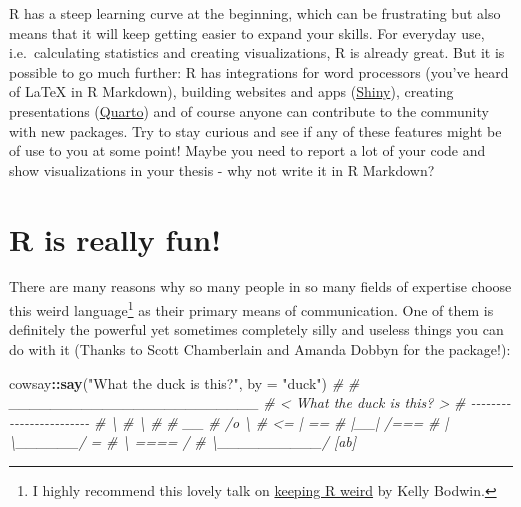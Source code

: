 \documentclass[
]{book}
\newenvironment{Shaded}{\begin{snugshade}}{\end{snugshade}}
\newcommand{\AttributeTok}[1]{\textcolor[rgb]{0.13,0.29,0.53}{#1}}
\newcommand{\CommentTok}[1]{\textcolor[rgb]{0.56,0.35,0.01}{\textit{#1}}}
\newcommand{\FunctionTok}[1]{\textcolor[rgb]{0.13,0.29,0.53}{\textbf{#1}}}
\newcommand{\NormalTok}[1]{#1}
\newcommand{\SpecialCharTok}[1]{\textcolor[rgb]{0.81,0.36,0.00}{\textbf{#1}}}
\newcommand{\StringTok}[1]{\textcolor[rgb]{0.31,0.60,0.02}{#1}}
\begin{document}
R has a steep learning curve at the beginning, which can be frustrating but also means that it will keep getting easier to expand your skills.
For everyday use, i.e.~calculating statistics and creating visualizations, R is already great.
But it is possible to go much further: R has integrations for word processors (you've heard of LaTeX in R Markdown), building websites and apps (\href{https://shiny.posit.co/r/getstarted/shiny-basics/lesson1/index.html}{Shiny}), creating presentations (\href{https://quarto.org/docs/get-started/hello/rstudio.html}{Quarto}) and of course anyone can contribute to the community with new packages.
Try to stay curious and see if any of these features might be of use to you at some point!
Maybe you need to report a lot of your code and show visualizations in your thesis - why not write it in R Markdown?

\section*{R is really fun!}\label{r-is-really-fun}

There are many reasons why so many people in so many fields of expertise choose this weird language\footnote{I highly recommend this lovely talk on \href{https://youtu.be/KOQBfC1WPwM?si=M_eStpWXBf56UGy7}{keeping R weird} by Kelly Bodwin.} as their primary means of communication.
One of them is definitely the powerful yet sometimes completely silly and useless things you can do with it (Thanks to Scott Chamberlain and Amanda Dobbyn for the package!):

\begin{Shaded}
\begin{Highlighting}[]
\NormalTok{cowsay}\SpecialCharTok{::}\FunctionTok{say}\NormalTok{(}\StringTok{"What the duck is this?"}\NormalTok{, }\AttributeTok{by =} \StringTok{"duck"}\NormalTok{)}
\CommentTok{\# }
\CommentTok{\#  \_\_\_\_\_\_\_\_\_\_\_\_\_\_\_\_\_\_\_\_\_\_\_\_ }
\CommentTok{\# \textless{} What the duck is this? \textgreater{}}
\CommentTok{\#  {-}{-}{-}{-}{-}{-}{-}{-}{-}{-}{-}{-}{-}{-}{-}{-}{-}{-}{-}{-}{-}{-}{-}{-} }
\CommentTok{\#       \textbackslash{}}
\CommentTok{\#        \textbackslash{}}
\CommentTok{\# }
\CommentTok{\#          \_\_}
\CommentTok{\#         /o \textbackslash{}}
\CommentTok{\#       \textless{}=   |         ==}
\CommentTok{\#         |\_\_|        /===}
\CommentTok{\#         |   \textbackslash{}\_\_\_\_\_\_/  =}
\CommentTok{\#         \textbackslash{}     ====   /}
\CommentTok{\#          \textbackslash{}\_\_\_\_\_\_\_\_\_\_/     [ab]}
\end{Highlighting}
\end{Shaded}
\end{document}

